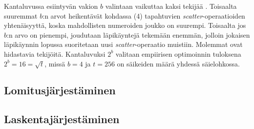 \documentclass[a4paper,11pt]{article}
\newcommand{\engl}[1]{\foreignlanguage{english}{\em #1}}
\begin{document}
Kantaluvussa esiintyvän vakion $b$ valintaan vaikuttaa kaksi tekijää \cite{satish2009}. Toisaalta suuremmat $b$:n arvot heikentävät kohdassa (4) tapahtuvien \engl{scatter}-o\-pe\-raa\-ti\-oi\-den yhtenäisyyttä, koska mahdollisten numeroiden joukko on suurempi. Toisaalta jos $b$:n arvo on pienempi, joudutaan läpikäyntejä tekemään enemmän, jolloin jokaisen läpikäynnin lopussa suoritetaan uusi \engl{scatter}-operaatio muistiin. Molemmat ovat hidastavia tekijöitä. Kantaluvuksi $2^b$ valitaan empiirisen optimoinnin tuloksena $2^b = 16 = \sqrt{t}$, missä $b = 4$ ja $t = 256$ on säikeiden määrä yhdessä säielohkossa.


\subsection{Lomitusjärjestäminen}


\subsection{Laskentajärjestäminen}




\printbibliography
\end{document}
